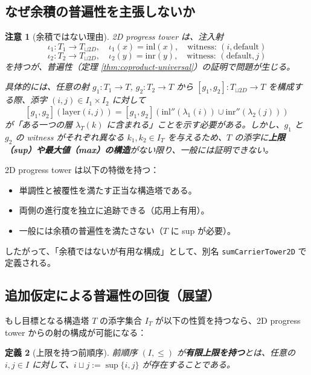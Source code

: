 \documentclass[a4paper,12pt]{ltjsarticle}
\newtheorem{definition}{定義}[section]
\newtheorem{remark}[definition]{注意}
\theoremstyle{definition}
\begin{document}
\subsection{なぜ余積の普遍性を主張しないか}

\begin{remark}[余積ではない理由]
2D progress tower は、注入射
\[
\iota_1 : T_1 \to T_{\sqcup 2D}, \quad \iota_1(x) = \mathrm{inl}(x), \quad \text{witness: } (i, \mathrm{default})
\]
\[
\iota_2 : T_2 \to T_{\sqcup 2D}, \quad \iota_2(y) = \mathrm{inr}(y), \quad \text{witness: } (\mathrm{default}, j)
\]
を持つが、普遍性（定理 \ref{thm:coproduct-universal}）の証明で問題が生じる。

具体的には、任意の射 $g_1 : T_1 \to T$, $g_2 : T_2 \to T$ から $[g_1, g_2] : T_{\sqcup 2D} \to T$ を構成する際、添字 $(i, j) \in I_1 \times I_2$ に対して
\[
[g_1, g_2](\text{layer}(i, j)) = [g_1, g_2](\mathrm{inl}''(\lambda_1(i)) \cup \mathrm{inr}''(\lambda_2(j)))
\]
が「ある一つの層 $\lambda_T(k)$ に含まれる」ことを示す必要がある。しかし、$g_1$ と $g_2$ の witness がそれぞれ異なる $k_1, k_2 \in I_T$ を与えるため、$T$ の添字に\textbf{上限（sup）や最大値（max）の構造}がない限り、一般には証明できない。
\end{remark}

\begin{tcolorbox}[title=重要な結論]
2D progress tower は以下の特徴を持つ：
\begin{itemize}
    \item[$\checkmark$] 単調性と被覆性を満たす正当な構造塔である。
    \item[$\checkmark$] 両側の進行度を独立に追跡できる（応用上有用）。
    \item[$\times$] 一般には余積の普遍性を満たさない（$T$ に sup が必要）。
\end{itemize}
したがって、「余積ではないが有用な構成」として、別名 \texttt{sumCarrierTower2D} で定義される。
\end{tcolorbox}

\subsection{追加仮定による普遍性の回復（展望）}

もし目標となる構造塔 $T$ の添字集合 $I_T$ が以下の性質を持つなら、2D progress tower からの射の構成が可能になる：

\begin{definition}[上限を持つ前順序]
前順序 $(I, \leq)$ が\textbf{有限上限を持つ}とは、任意の $i, j \in I$ に対して、$i \sqcup j := \sup\{i, j\}$ が存在することである。
\end{definition}
\end{document}
